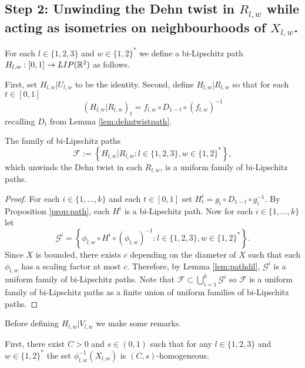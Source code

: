 \documentclass{amsart}
\begin{document}
\subsection{Step 2: Unwinding the Dehn twist in $R_{l,w}$ while acting as isometries on neighbourhoods of $X_{l,w}$.}


For each $l\in\{1,2,3\}$ and $w\in \{1,2\}^*$ we define a bi-Lipschitz path $H_{l,w}:[0,1] \to LIP(\mathbb{R}^2)$ as follows. 

First, set $H_{l,w}| U_{l,w}$ to be the identity. Second, define $H_{l,w} | R_{l,w}$ so that for each $t\in[0,1]$
\[ (H_{l,w} | R_{l,w})_t =  f_{l,w} \circ D_{1-t} \circ (f_{l,w})^{-1}\]
recalling $D_t$ from Lemma \ref{lem:dehntwistpath}. 

\begin{lemma}
\label{lem:gjtwists}
The family of bi-Lipschitz paths 
\[ \mathcal{F} := \left\{ H_{l,w} | R_{l,w} : l\in\{1,2,3\}, w\in\{1,2\}^*\right\},\] 
which unwinds the Dehn twist in each $R_{l,w}$, is a uniform family of bi-Lipschitz paths.
\end{lemma}

\begin{proof}
For each $i \in\{1,\dots,k\}$ and each $t\in [0,1]$ set $H^i_t = g_i\circ D_{1-t} \circ g_i^{-1}$. By Proposition \ref{prop:path}, each $H^i$ is a bi-Lipschitz path. Now for each $i \in\{1,\dots,k\}$ let
\[ \mathcal{G}^i = \left\{\phi_{l,w} \circ H^i \circ (\phi_{l,w})^{-1} :l\in\{1,2,3\}, w\in\{1,2\}^*\right\}.\]
Since $X$ is bounded, there exists $c$ depending on the diameter of $X$ such that each $\phi_{l,w}$ has a scaling factor at most $c$. Therefore, by Lemma \ref{lem:pathdil}, $\mathcal{G}^i$ is a uniform family of bi-Lipschitz paths. Note that $\mathcal{F} \subset \bigcup_{i=1}^k \mathcal{G}^i$ so $\mathcal{F}$ is a uniform family of bi-Lipschitz paths as a finite union of uniform families of bi-Lipschitz paths.
\end{proof}

Before defining $H_{l,w}|V_{l,w}$ we make some remarks. 

First, there exist $C>0$ and $s \in (0,1)$ such that for any $l\in\{1,2,3\}$ and $w\in\{1,2\}^*$ the set $\phi_{l,w}^{-1}(X_{l,w})$ is $(C,s)$-homogeneous.
\end{document}
